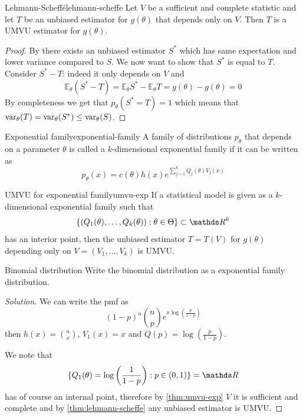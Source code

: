 \documentclass[12pt]{extarticle}
\renewcommand{\var}{{\operatorfont var}}
\newcommand{\E}{\mathds{E}}
\begin{document}
\begin{theorem}{Lehmann-Scheffé}{lehmann-scheffe}
    Let $V$ be a sufficient and complete statistic and let $T$ be an unbiased estimator for $g(\theta)$ that depends only on $V$.
    Then $T$ is a UMVU estimator for $g(\theta)$.
\end{theorem}
\begin{proof}
    By  there exists an unbiased estimator $S^*$ which has same expectation and lower variance compared to $S$.
    We now want to show that $S^*$ is equal to $T$.
    Consider $S^* - T$: indeed it only depends on $V$ and
    \begin{equation}
        \E_\theta(S^* - T) = \E_\theta S^* -\E_\theta T = g(\theta) - g(\theta) = 0
    \end{equation}
    By completeness we get that $p_\theta(S^* = T) = 1$ which means that $\var_\theta(T) = \var_\theta(S^*) \leq \var_\theta(S)$.
\end{proof}

\begin{definition}{Exponential family}{exponential-family}
    A family of distributions $p_\theta$ that depends on a parameter $\theta$
    is called a $k$-dimensional exponential family if it can be written as
    \begin{equation}
        p_\theta(x) = c(\theta) h(x)e^{\sum^k_{j=1} Q_j(\theta) V_j(x)}
    \end{equation}
\end{definition}

\begin{theorem}{UMVU for exponential family}{umvu-exp}
    If a statistical model is given as a $k$-dimensional exponential family such that
    \begin{equation}
        \{(Q_1(\theta), \dots, Q_k(\theta)) : \theta \in \Theta \} \subset \R^k
    \end{equation}
    has an interior point, then the unbiased estimator $T = T(V)$ for $g(\theta)$
    depending only on $V = (V_1, \dots, V_k)$ is UMVU.
\end{theorem}

\begin{example}{Binomial distribution}{}
    Write the binomial distribution as a exponential family distribution.
\end{example}
\begin{proof}[Solution]
    We can write the pmf as
    \begin{equation}
        (1-p)^n \binom{n}{p}e^{x \log\left(\frac{p}{1-p}\right)}
    \end{equation}
    then $h(x) = \binom{n}{x}$, $V_1(x) = x$ and $Q(p) = \log\left(\frac{p}{1-p}\right)$.

    We note that
    \begin{equation}
        \{Q_1(\theta) = \log \left( \frac{1}{1-p} \right) : p\in(0, 1)\} = \R
    \end{equation}
    has of course an internal point, therefore by \cref{thm:umvu-exp} $V$ it is sufficient and complete
    and by \cref{thm:lehmann-scheffe} any unbiased estimator is UMVU.
\end{proof}
\end{document}
